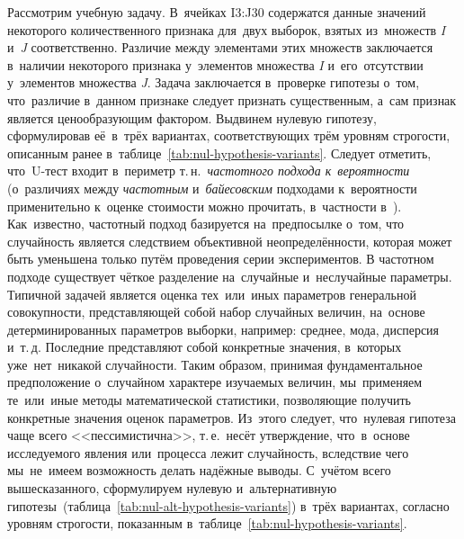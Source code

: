 \documentclass[]{scrartcl}
\begin{document}
Рассмотрим учебную задачу. В~ячейках I3:J30 содержатся данные значений некоторого количественного признака для~двух выборок, взятых из~множеств \textit{I} и~\textit{J} соответственно. Различие между элементами этих множеств заключается в~наличии некоторого признака у~элементов множества \textit{I} и~его~отсутствии у~элементов множества \textit{J}. Задача заключается в~проверке гипотезы о~том, что~различие в~данном признаке следует признать существенным, а~сам признак является ценообразующим фактором. Выдвинем нулевую гипотезу, сформулировав её~в~трёх вариантах, соответствующих трём уровням строгости, описанным ранее в~таблице~\ref{tab:nul-hypothesis-variants}. Следует отметить, что~U-тест входит в~периметр т.\,н.~\emph{частотного подхода к~вероятности} (о~различиях между \emph{частотным} и~\emph{байесовским} подходами к~вероятности применительно к~оценке стоимости можно прочитать, в~частности в~\cite{Murashev:freq-baye-prob}). Как~известно, частотный подход базируется на~предпосылке о~том, что случайность является следствием объективной неопределённости, которая может быть уменьшена только путём проведения серии экспериментов. В частотном подходе существует чёткое разделение на~случайные и~неслучайные параметры. Типичной задачей является оценка тех~или~иных параметров генеральной совокупности, представляющей собой набор случайных величин, на~основе детерминированных параметров выборки, например: среднее, мода, дисперсия и~т.\,д. Последние представляют собой конкретные значения, в~которых уже~нет~никакой случайности. Таким образом, принимая фундаментальное предположение о~случайном характере изучаемых величин, мы~применяем те~или~иные методы математической статистики, позволяющие получить конкретные значения оценок параметров. Из~этого следует, что~нулевая гипотеза чаще всего <<пессимистична>>, т.\,е.~несёт утверждение, что~в~основе исследуемого явления или~процесса лежит случайность, вследствие чего мы~не~имеем возможность делать надёжные выводы. С~учётом всего вышесказанного, сформулируем нулевую и~альтернативную гипотезы~(таблица~\ref{tab:nul-alt-hypothesis-variants}) в~трёх вариантах, согласно уровням строгости, показанным в~таблице~\ref{tab:nul-hypothesis-variants}.
\end{document}
